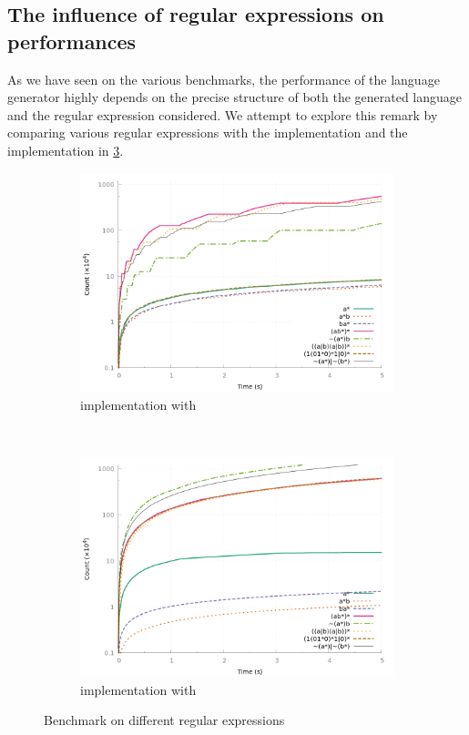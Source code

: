 \subsection{The influence of regular expressions on performances}

As we have seen on the various benchmarks, the performance of the language
generator highly depends on the precise structure of both
the generated language and the regular expression considered.
We attempt to explore this remark by comparing various regular expressions
with the  \haskell implementation and the 
\ocaml implementation in \cref{bench:langs}.


\begin{figure}[h]
  \centering
  \begin{subfigure}[t]{0.45\linewidth}
    \centering
    \includegraphics[height=0.66\linewidth]{measure/haskell_langs.png}
    \caption{\haskell implementation with }
    \label{bench:haskell:langs}
  \end{subfigure}~
  \begin{subfigure}[t]{0.45\linewidth}
    \centering
    \includegraphics[height=0.66\linewidth]{measure/ocaml_langs.png}
    \caption{\ocaml implementation with }
    \label{bench:ocaml:langs}
  \end{subfigure}
  \caption{Benchmark on different regular expressions}
  \label{bench:langs}
\end{figure}

